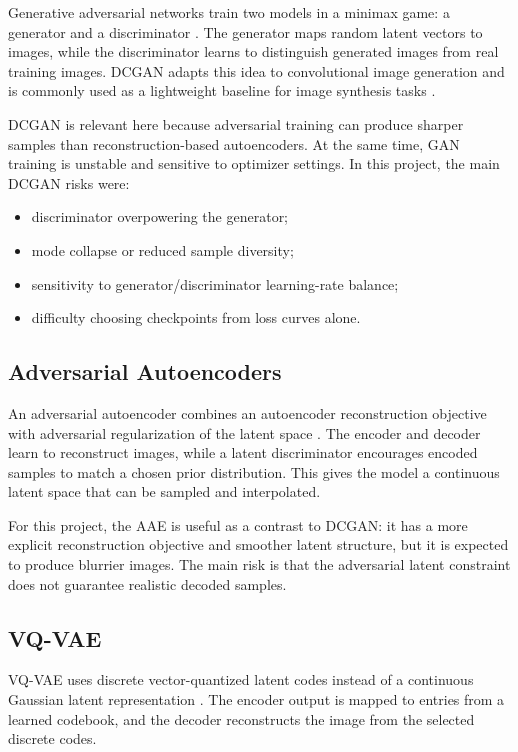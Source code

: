 \documentclass[11pt,a4paper]{article}
\begin{document}
Generative adversarial networks train two models in a minimax game: a generator and a discriminator \cite{goodfellow2014gan}. The generator maps random latent vectors to images, while the discriminator learns to distinguish generated images from real training images. DCGAN adapts this idea to convolutional image generation and is commonly used as a lightweight baseline for image synthesis tasks \cite{radford2015dcgan}.

DCGAN is relevant here because adversarial training can produce sharper samples than reconstruction-based autoencoders. At the same time, GAN training is unstable and sensitive to optimizer settings. In this project, the main DCGAN risks were:

\begin{itemize}[leftmargin=*]
    \item discriminator overpowering the generator;
    \item mode collapse or reduced sample diversity;
    \item sensitivity to generator/discriminator learning-rate balance;
    \item difficulty choosing checkpoints from loss curves alone.
\end{itemize}

\subsection{Adversarial Autoencoders}

An adversarial autoencoder combines an autoencoder reconstruction objective with adversarial regularization of the latent space \cite{makhzani2015aae}. The encoder and decoder learn to reconstruct images, while a latent discriminator encourages encoded samples to match a chosen prior distribution. This gives the model a continuous latent space that can be sampled and interpolated.

For this project, the AAE is useful as a contrast to DCGAN: it has a more explicit reconstruction objective and smoother latent structure, but it is expected to produce blurrier images. The main risk is that the adversarial latent constraint does not guarantee realistic decoded samples.

\subsection{VQ-VAE}

VQ-VAE uses discrete vector-quantized latent codes instead of a continuous Gaussian latent representation \cite{oord2017vqvae}. The encoder output is mapped to entries from a learned codebook, and the decoder reconstructs the image from the selected discrete codes.
\end{document}
